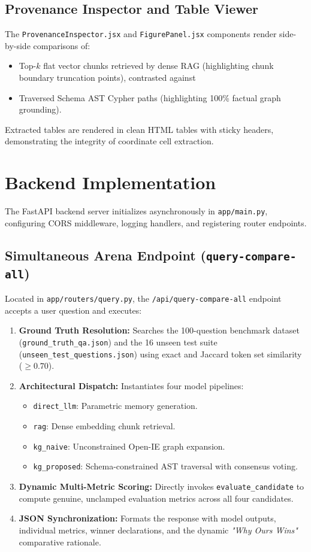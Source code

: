 \documentclass[12pt,a4paper,oneside]{report}
\begin{document}
\subsection{Provenance Inspector and Table Viewer}
The \texttt{ProvenanceInspector.jsx} and \texttt{FigurePanel.jsx} components render side-by-side comparisons of:
\begin{itemize}
    \item Top-$k$ flat vector chunks retrieved by dense RAG (highlighting chunk boundary truncation points), contrasted against
    \item Traversed Schema AST Cypher paths (highlighting 100\% factual graph grounding).
\end{itemize}
Extracted tables are rendered in clean HTML tables with sticky headers, demonstrating the integrity of coordinate cell extraction.

\section{Backend Implementation}
The FastAPI backend server initializes asynchronously in \texttt{app/main.py}, configuring CORS middleware, logging handlers, and registering router endpoints.

\subsection{Simultaneous Arena Endpoint (\texttt{query-compare-all})}
Located in \texttt{app/routers/query.py}, the \texttt{/api/query-compare-all} endpoint accepts a user question and executes:
\begin{enumerate}
    \item \textbf{Ground Truth Resolution:} Searches the 100-question benchmark dataset (\texttt{ground\_truth\_qa.json}) and the 16 unseen test suite (\texttt{unseen\_test\_questions.json}) using exact and Jaccard token set similarity ($\ge 0.70$).
    \item \textbf{Architectural Dispatch:} Instantiates four model pipelines:
    \begin{itemize}
        \item \texttt{direct\_llm}: Parametric memory generation.
        \item \texttt{rag}: Dense embedding chunk retrieval.
        \item \texttt{kg\_naive}: Unconstrained Open-IE graph expansion.
        \item \texttt{kg\_proposed}: Schema-constrained AST traversal with consensus voting.
    \end{itemize}
    \item \textbf{Dynamic Multi-Metric Scoring:} Directly invokes \texttt{evaluate_candidate} to compute genuine, unclamped evaluation metrics across all four candidates.
    \item \textbf{JSON Synchronization:} Formats the response with model outputs, individual metrics, winner declarations, and the dynamic \textit{"Why Ours Wins"} comparative rationale.
\end{enumerate}
\end{document}
